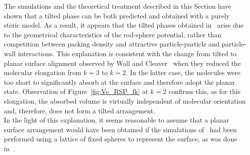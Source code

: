 The simulations and the theoretical treatment described in this Section
have shown that a tilted phase can be both predicted and obtained with a purely steric model.
As a result, it appears that the tilted phases obtained 
in~\cite{ZhangChakrabarti96, WallCleaver97,TeixeiraChrzanowska01, LathamCleaver00} arise due to
the geometrical characteristics of the rod-sphere potential, rather than competition between
packing density and attractive particle-particle and particle-wall interactions. 
This explanation is consistent with the
change from tilted to planar surface alignment observed by Wall and 
Cleaver~\cite{WallCleaver97,WallCleaver03}
when they reduced the molecular elongation from $k=3$ to $k=2$. In the latter
case, the molecules were too short to significantly absorb at the surface and therefore adopt the
planar state. Observation of Figure~\ref{fig:Ve_RSP_fk} at $k=2$ confirms this, as for this
elongation, the absorbed volume is virtually independent of molecular orientation and, therefore,
does not form a tilted arrangement.\\
In the light of this explanation, it seems
reasonable to assume that a planar surface arrangement would have been obtained if the
simulations of~\cite{WallCleaver97,TeixeiraChrzanowska01, LathamCleaver00} had been performed using
a lattice of fixed spheres to represent the surface, as was done in~\cite{PalermoBiscarini98}.\\




